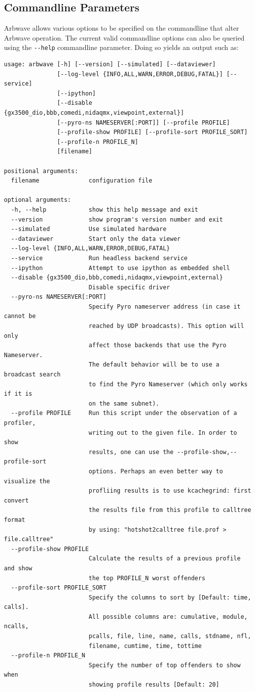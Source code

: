 \subsection{Commandline Parameters}\label{sec:overview:cmdline}
Arbwave allows various options to be specified on the commandline that alter
Arbwave operation.  The current valid commandline options can also be queried
using the \verb|--help| commandline parameter.  Doing so yields an output such
as:
\begin{verbatim}
usage: arbwave [-h] [--version] [--simulated] [--dataviewer]
               [--log-level {INFO,ALL,WARN,ERROR,DEBUG,FATAL}] [--service]
               [--ipython]
               [--disable {gx3500_dio,bbb,comedi,nidaqmx,viewpoint,external}]
               [--pyro-ns NAMESERVER[:PORT]] [--profile PROFILE]
               [--profile-show PROFILE] [--profile-sort PROFILE_SORT]
               [--profile-n PROFILE_N]
               [filename]

positional arguments:
  filename              configuration file

optional arguments:
  -h, --help            show this help message and exit
  --version             show program's version number and exit
  --simulated           Use simulated hardware
  --dataviewer          Start only the data viewer
  --log-level {INFO,ALL,WARN,ERROR,DEBUG,FATAL}
  --service             Run headless backend service
  --ipython             Attempt to use ipython as embedded shell
  --disable {gx3500_dio,bbb,comedi,nidaqmx,viewpoint,external}
                        Disable specific driver
  --pyro-ns NAMESERVER[:PORT]
                        Specify Pyro nameserver address (in case it cannot be
                        reached by UDP broadcasts). This option will only
                        affect those backends that use the Pyro Nameserver.
                        The default behavior will be to use a broadcast search
                        to find the Pyro Nameserver (which only works if it is
                        on the same subnet).
  --profile PROFILE     Run this script under the observation of a profiler,
                        writing out to the given file. In order to show
                        results, one can use the --profile-show,--profile-sort
                        options. Perhaps an even better way to visualize the
                        profliing results is to use kcachegrind: first convert
                        the results file from this profile to calltree format
                        by using: "hotshot2calltree file.prof > file.calltree"
  --profile-show PROFILE
                        Calculate the results of a previous profile and show
                        the top PROFILE_N worst offenders
  --profile-sort PROFILE_SORT
                        Specify the columns to sort by [Default: time, calls].
                        All possible columns are: cumulative, module, ncalls,
                        pcalls, file, line, name, calls, stdname, nfl,
                        filename, cumtime, time, tottime
  --profile-n PROFILE_N
                        Specify the number of top offenders to show when
                        showing profile results [Default: 20]
\end{verbatim}
